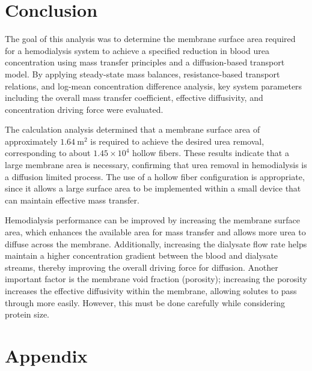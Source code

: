 \documentclass[10.5pt]{article}
\begin{document}
\section{Conclusion}

The goal of this analysis was to determine the membrane surface area required for a hemodialysis system to achieve a specified reduction in blood urea concentration using mass transfer principles and a diffusion-based transport model. By applying steady-state mass balances, resistance-based transport relations, and log-mean concentration difference analysis, key system parameters including the overall mass transfer coefficient, effective diffusivity, and concentration driving force were evaluated.

\vspace{0.3cm}


The calculation analysis determined that a membrane surface area of approximately $1.64 \ \text{m}^2$ is required to achieve the desired urea removal, corresponding to about $1.45 \times 10^4$ hollow fibers. These results indicate that a large membrane area is necessary, confirming that urea removal in hemodialysis is a diffusion limited process. The use of a hollow fiber configuration is appropriate, since it allows a large surface area to be implemented within a small device that can maintain effective mass transfer.

\vspace{0.3cm}


Hemodialysis performance can be improved by increasing the membrane surface area, which enhances the available area for mass transfer and allows more urea to diffuse across the membrane. Additionally, increasing the dialysate flow rate helps maintain a higher concentration gradient between the blood and dialysate streams, thereby improving the overall driving force for diffusion. Another important factor is the membrane void fraction (porosity); increasing the porosity increases the effective diffusivity within the membrane, allowing solutes to pass through more easily. However, this must be done carefully while considering protein size. 






\newpage








\newpage
\section*{Appendix}
\end{document}
